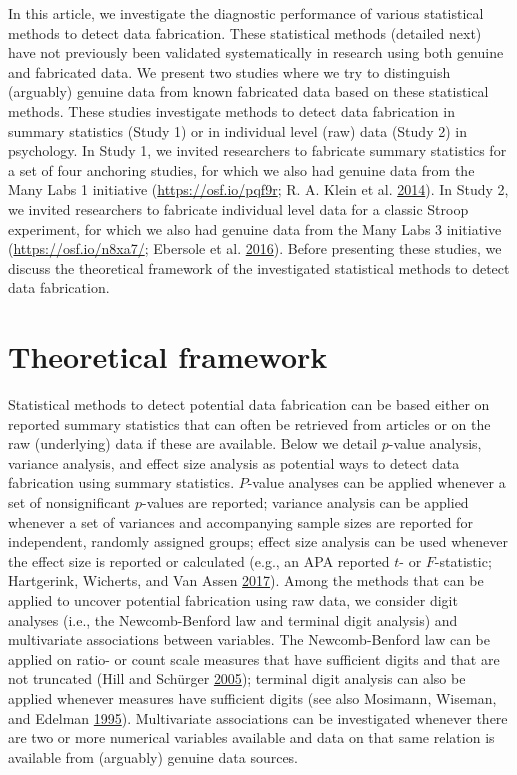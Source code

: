 \documentclass[a5paper]{book}
\begin{document}
In this article, we investigate the diagnostic performance of various
statistical methods to detect data fabrication. These statistical
methods (detailed next) have not previously been validated
systematically in research using both genuine and fabricated data. We
present two studies where we try to distinguish (arguably) genuine data
from known fabricated data based on these statistical methods. These
studies investigate methods to detect data fabrication in summary
statistics (Study 1) or in individual level (raw) data (Study 2) in
psychology. In Study 1, we invited researchers to fabricate summary
statistics for a set of four anchoring studies, for which we also had
genuine data from the Many Labs 1 initiative
(\url{https://osf.io/pqf9r}; R. A. Klein et al.
\protect\hyperlink{ref-doi:10.1027ux2f1864-9335ux2fa000178}{2014}). In
Study 2, we invited researchers to fabricate individual level data for a
classic Stroop experiment, for which we also had genuine data from the
Many Labs 3 initiative (\url{https://osf.io/n8xa7/}; Ebersole et al.
\protect\hyperlink{ref-doi:10.1016ux2fj.jesp.2015.10.012}{2016}). Before
presenting these studies, we discuss the theoretical framework of the
investigated statistical methods to detect data fabrication.

\section{Theoretical framework}\label{theoretical-framework-1}

Statistical methods to detect potential data fabrication can be based
either on reported summary statistics that can often be retrieved from
articles or on the raw (underlying) data if these are available. Below
we detail \(p\)-value analysis, variance analysis, and effect size
analysis as potential ways to detect data fabrication using summary
statistics. \(P\)-value analyses can be applied whenever a set of
nonsignificant \(p\)-values are reported; variance analysis can be
applied whenever a set of variances and accompanying sample sizes are
reported for independent, randomly assigned groups; effect size analysis
can be used whenever the effect size is reported or calculated (e.g., an
APA reported \(t\)- or \(F\)-statistic; Hartgerink, Wicherts, and Van
Assen \protect\hyperlink{ref-doi:10.1525ux2fcollabra.71}{2017}). Among
the methods that can be applied to uncover potential fabrication using
raw data, we consider digit analyses (i.e., the Newcomb-Benford law and
terminal digit analysis) and multivariate associations between
variables. The Newcomb-Benford law can be applied on ratio- or count
scale measures that have sufficient digits and that are not truncated
(Hill and Schürger
\protect\hyperlink{ref-doi:10.1016ux2fj.spa.2005.05.003}{2005});
terminal digit analysis can also be applied whenever measures have
sufficient digits (see also Mosimann, Wiseman, and Edelman
\protect\hyperlink{ref-doi:10.1080ux2f08989629508573866}{1995}).
Multivariate associations can be investigated whenever there are two or
more numerical variables available and data on that same relation is
available from (arguably) genuine data sources.
\end{document}
